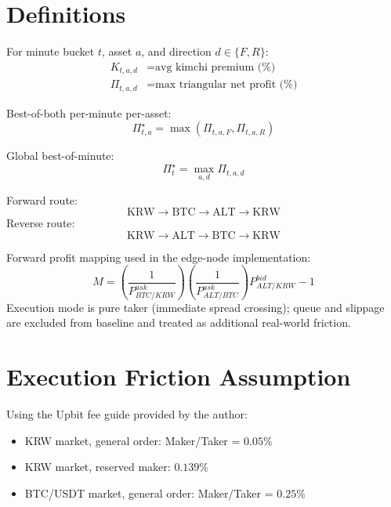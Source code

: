 \documentclass[11pt,a4paper]{article}
\begin{document}
\section{Definitions}
For minute bucket $t$, asset $a$, and direction $d \in \{F,R\}$:
\begin{align}
K_{t,a,d} &= \text{avg kimchi premium (\%)} \\
\Pi_{t,a,d} &= \text{max triangular net profit (\%)}
\end{align}

Best-of-both per-minute per-asset:
\begin{equation}
\Pi^{\star}_{t,a} = \max\left(\Pi_{t,a,F}, \Pi_{t,a,R}\right)
\end{equation}

Global best-of-minute:
\begin{equation}
\Pi^{\star}_{t} = \max_{a,d}\Pi_{t,a,d}
\end{equation}

Forward route:
\begin{equation}
\mathrm{KRW} \rightarrow \mathrm{BTC} \rightarrow \mathrm{ALT} \rightarrow \mathrm{KRW}
\end{equation}
Reverse route:
\begin{equation}
\mathrm{KRW} \rightarrow \mathrm{ALT} \rightarrow \mathrm{BTC} \rightarrow \mathrm{KRW}
\end{equation}

Forward profit mapping used in the edge-node implementation:
\begin{equation}
M = \left(\frac{1}{P^{ask}_{BTC/KRW}}\right)\left(\frac{1}{P^{ask}_{ALT/BTC}}\right)P^{bid}_{ALT/KRW} - 1
\end{equation}
Execution mode is pure taker (immediate spread crossing); queue and slippage are excluded from baseline and treated as additional real-world friction.

\section{Execution Friction Assumption}
Using the Upbit fee guide provided by the author:
\begin{itemize}
    \item KRW market, general order: Maker/Taker = $0.05\%$
    \item KRW market, reserved maker: $0.139\%$
    \item BTC/USDT market, general order: Maker/Taker = $0.25\%$
\end{itemize}
\end{document}
